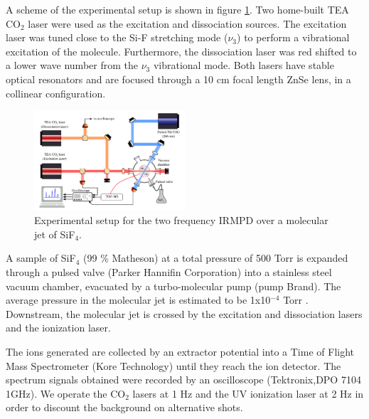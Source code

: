 \documentclass[global,twocolumn]{svjour}
\begin{document}
A scheme of the experimental setup is shown in figure \ref{fig:setup}. Two home-built TEA CO$_{2}$ laser were used as the excitation and dissociation sources. The excitation laser was tuned close to the Si-F stretching mode ($\nu_{3}$) to perform a vibrational excitation of the molecule. Furthermore, the dissociation laser was red shifted to a lower wave number from the $\nu_{3}$ vibrational mode. Both lasers have stable optical resonators and are focused through a 10 cm focal length ZnSe lens, in a collinear configuration.     

\begin{figure}[h]
	\includegraphics[width = 0.5\textwidth]{figures/dispositivo_2f_english.pdf}%
	\caption{\label{fig:setup} Experimental setup for the two frequency IRMPD over a molecular jet of SiF$_{4}$.}
\end{figure}

A sample of SiF$_{4}$ (99 \% Matheson) at a total pressure of 500 Torr is expanded through a pulsed valve (Parker Hannifin Corporation) into a stainless steel vacuum chamber, evacuated by a turbo-molecular pump (pump Brand). The average pressure in the molecular jet is estimated to be 1x10$^{-4}$ Torr \cite{bishop09}. Downstream, the molecular jet is crossed by the excitation and dissociation lasers and the ionization laser.

The ions generated are collected by an extractor potential into a Time of Flight Mass Spectrometer (Kore Technology) until they reach the ion detector. The spectrum signals obtained were recorded by an oscilloscope (Tektronix,DPO 7104 1GHz). We operate the CO$_{2}$ lasers at 1 Hz and the UV ionization laser at 2 Hz in order to discount the background on alternative shots. 
\end{document}
